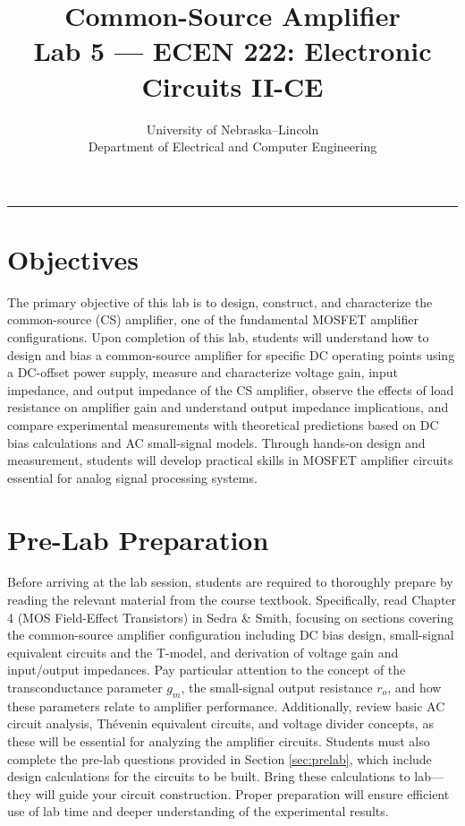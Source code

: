 \documentclass[10pt]{article}
\title{\textbf{\Huge Common-Source Amplifier}\\
\large Lab 5 — ECEN 222: Electronic Circuits II-CE}
\author{
\large University of Nebraska–Lincoln \\
\large Department of Electrical and Computer Engineering
}
\date{} %
\begin{document}
\thispagestyle{fancy}
\maketitle
\rule{\textwidth}{0.5pt}


\section{Objectives}

The primary objective of this lab is to design, construct, and characterize the common-source (CS) amplifier, one of the fundamental MOSFET amplifier configurations. Upon completion of this lab, students will understand how to design and bias a common-source amplifier for specific DC operating points using a DC-offset power supply, measure and characterize voltage gain, input impedance, and output impedance of the CS amplifier, observe the effects of load resistance on amplifier gain and understand output impedance implications, and compare experimental measurements with theoretical predictions based on DC bias calculations and AC small-signal models.  Through hands-on design and measurement, students will develop practical skills in MOSFET amplifier circuits essential for analog signal processing systems.

\section{Pre-Lab Preparation}

Before arriving at the lab session, students are required to thoroughly prepare by reading the relevant material from the course textbook.  Specifically, read Chapter 4 (MOS Field-Effect Transistors) in Sedra \& Smith, focusing on sections covering the common-source amplifier configuration including DC bias design, small-signal equivalent circuits and the T-model, and derivation of voltage gain and input/output impedances. Pay particular attention to the concept of the transconductance parameter $g_m$, the small-signal output resistance $r_o$, and how these parameters relate to amplifier performance. Additionally, review basic AC circuit analysis, Thévenin equivalent circuits, and voltage divider concepts, as these will be essential for analyzing the amplifier circuits.  Students must also complete the pre-lab questions provided in Section \ref{sec:prelab}, which include design calculations for the circuits to be built.  Bring these calculations to lab—they will guide your circuit construction.  Proper preparation will ensure efficient use of lab time and deeper understanding of the experimental results.
\end{document}
